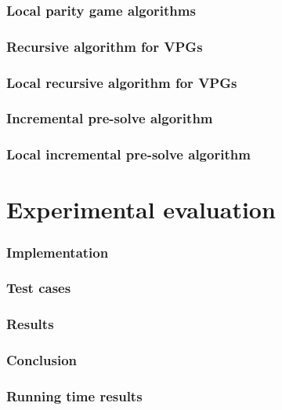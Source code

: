 \documentclass[]{article}
\begin{document}
\section{Local parity game algorithms}


\section{Recursive algorithm for VPGs}


\section{Local recursive algorithm for VPGs}


\section{Incremental pre-solve algorithm}


\section{Local incremental pre-solve algorithm}


\pagebreak
\part{Experimental evaluation}


\section{Implementation}


\section{Test cases}


\section{Results}


\pagebreak
\section{Conclusion}


\pagebreak
\begin{appendices}
\section{Running time results}
\label{appendix:resultsexact}

\end{appendices}

 

\end{document}
